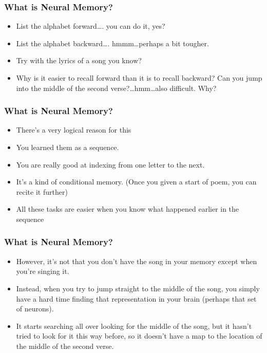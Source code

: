 \begin{frame}[fragile] \frametitle{What is Neural Memory?}

\begin{itemize}
\item List the alphabet forward\ldots. you can do it, yes?
\item List the alphabet backward\ldots. hmmm\ldots perhaps a bit tougher.
\item Try with the lyrics of a song you know?
\item Why is it easier to recall forward than it is to recall backward? Can you jump into the middle of the second verse?\ldots hmm\ldots also difficult. Why?
\end{itemize}
\end{frame}

\begin{frame}[fragile] \frametitle{What is Neural Memory?}

\begin{itemize}
\item There's a very logical reason for this
\item You learned them as a sequence. 
\item You are really good at indexing from one letter to the next.
\item It's a kind of conditional memory. (Once you given a start of poem, you can recite it further)
\item All these  tasks are easier when you know what happened earlier in the sequence
\end{itemize}
\end{frame}

\begin{frame}[fragile] \frametitle{What is Neural Memory?}

\begin{itemize}
\item However, it's not that you don't have the song in your memory except when you're singing it. 
\item Instead, when you try to jump straight to the middle of the song, you simply have a hard time finding that representation in your brain (perhaps that set of neurons).
\item It starts searching all over looking for the middle of the song, but it hasn't tried to look for it this way before, so it doesn't have a map to the location of the middle of the second verse.
\end{itemize}
\end{frame}

